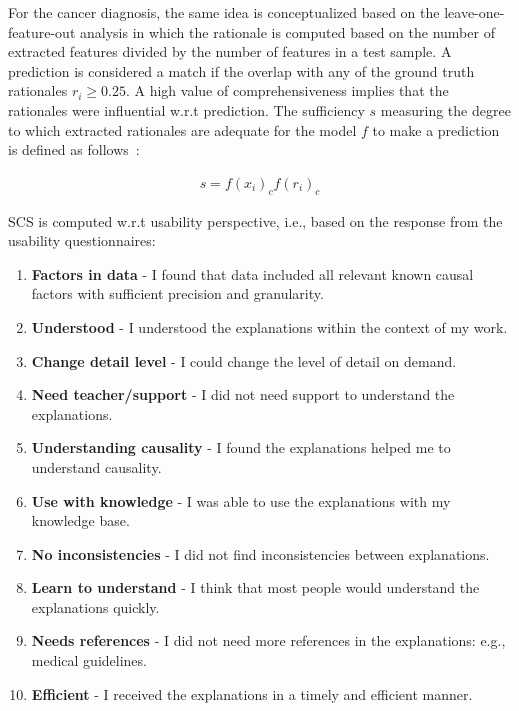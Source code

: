 \hspace*{3.5mm} For the cancer diagnosis, the same idea is conceptualized based on the leave-one-feature-out analysis in which the rationale is computed based on the number of extracted features divided by the number of features in a test sample. A prediction is considered a match if the overlap with any of the ground truth rationales $r_i \geq 0.25$. A high value of comprehensiveness implies that the rationales were influential w.r.t prediction. The sufficiency $s$ measuring the degree to which extracted rationales are adequate for the model $f$ to make a prediction is defined  as follows~\cite{deyoung2019eraser}: 

\begin{align}
    s  =  f\left(x_{i}\right)_{c} f\left(r_{i}\right)_{c}
\end{align}

\hspace*{3.5mm} SCS is computed w.r.t usability perspective, i.e., based on the response from the usability questionnaires:  

\begin{enumerate}[noitemsep]
    \item \textbf{Factors in data} - I found that data included all relevant known causal factors with sufficient precision and granularity.
    \item \textbf{Understood} - I understood the explanations within the context of my work.
    \item \textbf{Change detail level} - I could change the level of detail on demand.
    \item \textbf{Need teacher/support} - I did not need support to understand the explanations.
    \item \textbf{Understanding causality} - I found the explanations helped me to understand causality.
    \item \textbf{Use with knowledge} - I was able to use the explanations with my knowledge base.
    \item \textbf{No inconsistencies} - I did not find inconsistencies between explanations.
    \item \textbf{Learn to understand} - I think that most people would understand the explanations quickly.
    \item \textbf{Needs references} - I did not need more references in the explanations: e.g., medical guidelines.
    \item \textbf{Efficient} - I received the explanations in a timely and efficient manner.
\end{enumerate}

